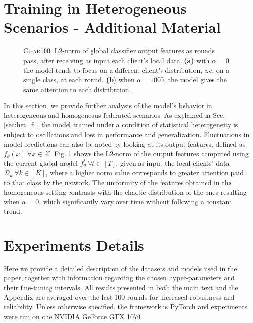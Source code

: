 \section{Training in Heterogeneous Scenarios - Additional Material}
\begin{figure}[t]
    \centering
    \caption{\textsc{Cifar100}. L2-norm of global classifier output features as rounds pass, after receiving as input each client's local data. \textbf{(a)} with $\alpha=0$, the model tends to focus on a different client's distribution, \textit{i.e.} on a single class, at each round. \textbf{(b)} when $\alpha=1000$, the model gives the same attention to each distribution.}
    \label{fig:clf_feats}
\end{figure}
In this section, we provide further analysis of the model's behavior in heterogeneous and homogeneous federated scenarios. As explained in Sec. \ref{sec:het_fl}, the model trained under a condition of statistical heterogeneity is subject to oscillations and loss in performance and generalization. Fluctuations in model predictions can also be noted by looking at its output features, defined as $f_\theta(x) \: \forall x\in\mathcal{X}$. Fig. \ref{fig:clf_feats} shows the L2-norm of the output features computed using the current global model $f_{\theta}^t \: \forall t\in[T]$, given as input the local clients' data $\mathcal{D}_k \: \forall k\in[K]$, where a higher norm value corresponds to greater attention paid to that class by the network. The uniformity of the features obtained in the homogeneous setting contrasts with the chaotic distribution of the ones resulting when $\alpha=0$, which significantly vary over time without following a constant trend.

\section{Experiments Details}
\label{app:exps}
Here we provide a detailed description of the datasets and models used in the paper, together with information regarding the chosen hyper-parameters and their fine-tuning intervals. All results presented in both the main text and the Appendix are averaged over the last 100 rounds for increased robustness and reliability. Unless otherwise specified, the framework is PyTorch \cite{NEURIPS2019_9015} and experiments were run on one NVIDIA GeForce GTX 1070.

